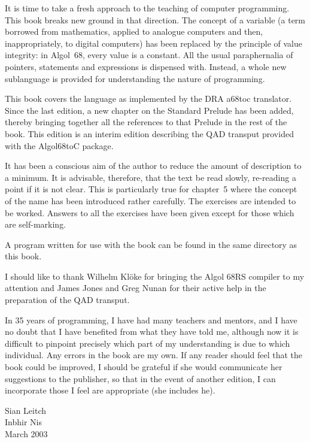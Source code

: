 It is time to take a fresh approach to the teaching of computer
programming.  This book breaks new ground in that direction.  The
concept of a variable (a term borrowed from mathematics, applied to
analogue computers and then, inappropriately, to digital computers) has
been replaced by the principle of value integrity: in Algol~68, every
value is a constant.  All the usual paraphernalia of pointers,
statements and expressions is dispensed with. Instead, a whole new
sublanguage is provided for understanding the nature of programming.

This book covers the language as implemented by the DRA a68toc
translator.  Since the last edition, a new chapter on the Standard
Prelude has been added, thereby bringing together all the references
to that Prelude in the rest of the book. This edition is an interim
edition describing the QAD transput provided with the Algol68toC package.

It has been a conscious aim of the author to reduce the amount of
description to a minimum.  It is advisable, therefore, that the text be
read slowly, re-reading a point if it is not clear.  This is
particularly true for chapter~5 where the concept of the name has been
introduced rather carefully. The exercises are intended to be worked. 
Answers to all the exercises have been given except for those which are
self-marking.

A program written for use with the book can be found in the same
directory as this book.

I should like to thank Wilhelm Kl\"oke for bringing the Algol 68RS
compiler to my attention and James Jones and Greg Nunan for their
active help in the preparation of the QAD transput.

In 35 years of programming, I have had many teachers and mentors, and I
have no doubt that I have benefited from what they have told me,
although now it is difficult to pinpoint precisely which part of my
understanding is due to which individual. Any errors in the book are my
own.  If any reader should feel that the book could be improved, I
should be grateful if she would communicate her suggestions to the
publisher, so that in the event of another edition, I can incorporate
those I feel are appropriate (she includes he).
\bigskip\bigskip
\begin{flushright}
Sian Leitch\\
Inbhir Nis\\
March 2003
\end{flushright}
